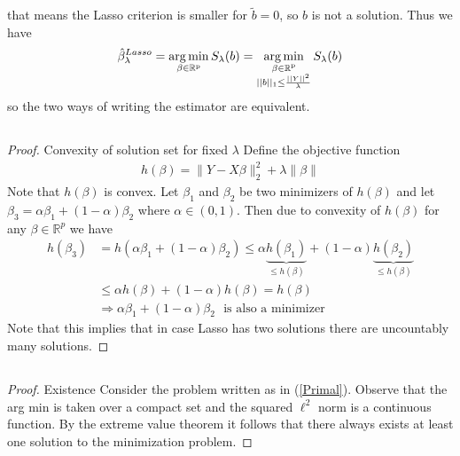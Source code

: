\documentclass{article}
\theoremstyle{definition}
\DeclareMathOperator*{\argmin}{arg\,min}
\begin{document}
that means the Lasso criterion is smaller for $\tilde{b}=0$, so $b$ is not a solution.
Thus we have
\begin{equation*}
 \hat{\beta}_\lambda^{Lasso} = \argmin_{\beta \in\rm \mathbb{R}^p} S_\lambda(b) = \argmin_{\substack{\beta \in\rm \mathbb{R}^p\\ ||b||_1 \leq \frac{||Y||^2}{\lambda}}} S_\lambda(b)
\end{equation*}
so the two ways of writing the estimator are equivalent.

\subsection{}\begin{proof} Convexity of solution set for fixed $\lambda$ \newline
Define the objective function
\begin{align*}
h(\beta)=\|Y-X\beta\|_2^2+\lambda\|\beta\|
\end{align*}
Note that $h(\beta)$ is convex. Let $\beta_1$ and $\beta_2$ be two minimizers of $h(\beta)$ and let $\beta_3=\alpha\beta_1+(1-\alpha)\beta_2$ where $\alpha \in (0,1)$. Then due to convexity of $h(\beta)$ for any $\beta \in \mathbb{R}^p$ we have
\begin{align*}
h(\beta_3)&=h(\alpha\beta_1+(1-\alpha)\beta_2) \leq \alpha \underbrace{h(\beta_1)}_{\leq h(\beta)}+(1-\alpha)\underbrace{h(\beta_2)}_{\leq h(\beta)} \\ &\leq \alpha h(\beta)+(1-\alpha)h(\beta)=h(\beta) \\ &\Rightarrow \alpha\beta_1+(1-\alpha)\beta_2 \ \ \ \text{is also a minimizer}
\end{align*}
Note that this implies that in case Lasso has two solutions there are uncountably many solutions.
\end{proof}

\subsection{} \begin{proof} Existence \newline
Consider the problem written as in (\ref{Primal}). Observe that the arg min is taken over a compact set and the squared $\ell^2$ norm is a continuous function. By the extreme value theorem it follows that there always exists at least one solution to the minimization problem.
\end{proof}

\subsection{}
\end{document}
